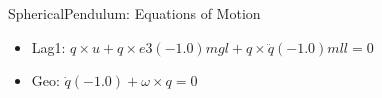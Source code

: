 SphericalPendulum: Equations of Motion
\begin{itemize}
\item Lag1: $q\times u+q\times e3 (-1.0) m g l+q\times \ddot{q} (-1.0) m l l = 0$
\item Geo: $\dot{q} (-1.0)+\omega \times q = 0$
\end{itemize}